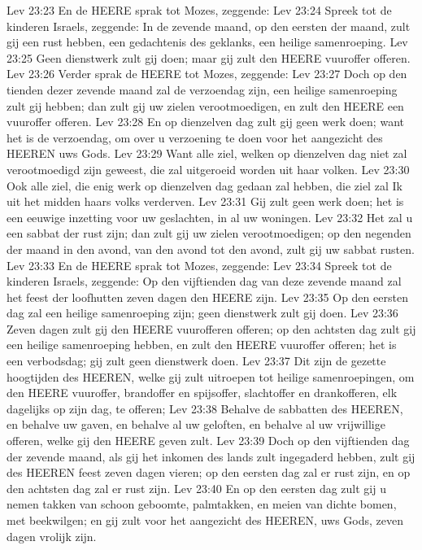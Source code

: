 Lev 23:23  En de HEERE sprak tot Mozes, zeggende:
Lev 23:24  Spreek tot de kinderen Israels, zeggende: In de zevende maand, op den eersten der maand, zult gij een rust hebben, een gedachtenis des geklanks, een heilige samenroeping.
Lev 23:25  Geen dienstwerk zult gij doen; maar gij zult den HEERE vuuroffer offeren.
Lev 23:26  Verder sprak de HEERE tot Mozes, zeggende:
Lev 23:27  Doch op den tienden dezer zevende maand zal de verzoendag zijn, een heilige samenroeping zult gij hebben; dan zult gij uw zielen verootmoedigen, en zult den HEERE een vuuroffer offeren.
Lev 23:28  En op dienzelven dag zult gij geen werk doen; want het is de verzoendag, om over u verzoening te doen voor het aangezicht des HEEREN uws Gods.
Lev 23:29  Want alle ziel, welken op dienzelven dag niet zal verootmoedigd zijn geweest, die zal uitgeroeid worden uit haar volken.
Lev 23:30  Ook alle ziel, die enig werk op dienzelven dag gedaan zal hebben, die ziel zal Ik uit het midden haars volks verderven.
Lev 23:31  Gij zult geen werk doen; het is een eeuwige inzetting voor uw geslachten, in al uw woningen.
Lev 23:32  Het zal u een sabbat der rust zijn; dan zult gij uw zielen verootmoedigen; op den negenden der maand in den avond, van den avond tot den avond, zult gij uw sabbat rusten.
Lev 23:33  En de HEERE sprak tot Mozes, zeggende:
Lev 23:34  Spreek tot de kinderen Israels, zeggende: Op den vijftienden dag van deze zevende maand zal het feest der loofhutten zeven dagen den HEERE zijn.
Lev 23:35  Op den eersten dag zal een heilige samenroeping zijn; geen dienstwerk zult gij doen.
Lev 23:36  Zeven dagen zult gij den HEERE vuurofferen offeren; op den achtsten dag zult gij een heilige samenroeping hebben, en zult den HEERE vuuroffer offeren; het is een verbodsdag; gij zult geen dienstwerk doen.
Lev 23:37  Dit zijn de gezette hoogtijden des HEEREN, welke gij zult uitroepen tot heilige samenroepingen, om den HEERE vuuroffer, brandoffer en spijsoffer, slachtoffer en drankofferen, elk dagelijks op zijn dag, te offeren;
Lev 23:38  Behalve de sabbatten des HEEREN, en behalve uw gaven, en behalve al uw geloften, en behalve al uw vrijwillige offeren, welke gij den HEERE geven zult.
Lev 23:39  Doch op den vijftienden dag der zevende maand, als gij het inkomen des lands zult ingegaderd hebben, zult gij des HEEREN feest zeven dagen vieren; op den eersten dag zal er rust zijn, en op den achtsten dag zal er rust zijn.
Lev 23:40  En op den eersten dag zult gij u nemen takken van schoon geboomte, palmtakken, en meien van dichte bomen, met beekwilgen; en gij zult voor het aangezicht des HEEREN, uws Gods, zeven dagen vrolijk zijn.
